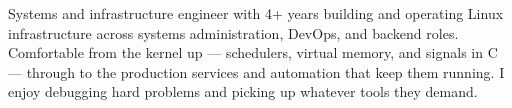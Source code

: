 
\begin{cvparagraph}
Systems and infrastructure engineer with 4+ years building and operating Linux infrastructure across systems administration, DevOps, and backend roles. Comfortable from the kernel up --- schedulers, virtual memory, and signals in C --- through to the production services and automation that keep them running. I enjoy debugging hard problems and picking up whatever tools they demand.
\end{cvparagraph}
